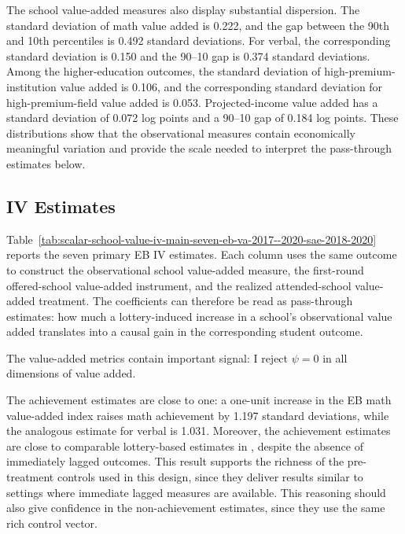 \documentclass[a4paper, article, english, oneside, unknownkeysallowed, 12pt]{memoir}
\begin{document}
The school value-added measures also display substantial dispersion.
The standard deviation of math value added is 0.222, and the gap between the 90th and 10th percentiles is 0.492 standard deviations.
For verbal, the corresponding standard deviation is 0.150 and the 90--10 gap is 0.374 standard deviations.
Among the higher-education outcomes, the standard deviation of high-premium-institution value added is 0.106, and the corresponding standard deviation for high-premium-field value added is 0.053.
Projected-income value added has a standard deviation of 0.072 log points and a 90--10 gap of 0.184 log points.
These distributions show that the observational measures contain economically meaningful variation and provide the scale needed to interpret the pass-through estimates below.

\subsection{IV Estimates}


Table~\ref{tab:scalar-school-value-iv-main-seven-eb-va-2017--2020-sae-2018-2020} reports the seven primary EB IV estimates.
Each column uses the same outcome to construct the observational school value-added measure, the first-round offered-school value-added instrument, and the realized attended-school value-added treatment.
The coefficients can therefore be read as pass-through estimates: how much a lottery-induced increase in a school's observational value added translates into a causal gain in the corresponding student outcome.

The value-added metrics contain important signal: I reject $\psi = 0$ in all dimensions of value added.

The achievement estimates are close to one: a one-unit increase in the EB math value-added index raises math achievement by 1.197 standard deviations, while the analogous estimate for verbal is 1.031.
Moreover, the achievement estimates are close to comparable lottery-based estimates in \textcite{angrist_leveraging_2017}, despite the absence of immediately lagged outcomes.
This result supports the richness of the pre-treatment controls used in this design, since they deliver results similar to settings where immediate lagged measures are available.
This reasoning should also give confidence in the non-achievement estimates, since they use the same rich control vector.
\end{document}
